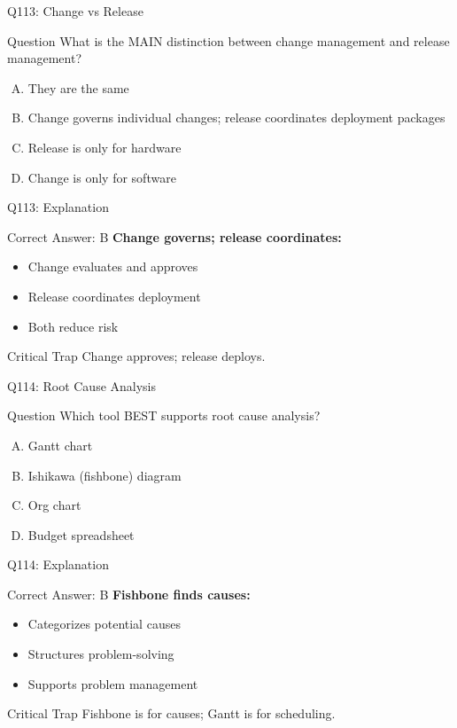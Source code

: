 \documentclass{beamer}
\begin{document}
	\begin{frame}{Q113: Change vs Release}
		\begin{block}{Question}
			What is the MAIN distinction between change management and release management?
		\end{block}
		\begin{enumerate}[(A)]
			\item They are the same
			\item Change governs individual changes; release coordinates deployment packages
			\item Release is only for hardware
			\item Change is only for software
		\end{enumerate}
	\end{frame}
	
	\begin{frame}{Q113: Explanation}
		\begin{block}{Correct Answer: B}
			\textbf{Change governs; release coordinates:}
			\begin{itemize}
				\item Change evaluates and approves
				\item Release coordinates deployment
				\item Both reduce risk
			\end{itemize}
		\end{block}
		\begin{alertblock}{Critical Trap}
			Change approves; release deploys.
		\end{alertblock}
	\end{frame}
	
	\begin{frame}{Q114: Root Cause Analysis}
		\begin{block}{Question}
			Which tool BEST supports root cause analysis?
		\end{block}
		\begin{enumerate}[(A)]
			\item Gantt chart
			\item Ishikawa (fishbone) diagram
			\item Org chart
			\item Budget spreadsheet
		\end{enumerate}
	\end{frame}
	
	\begin{frame}{Q114: Explanation}
		\begin{block}{Correct Answer: B}
			\textbf{Fishbone finds causes:}
			\begin{itemize}
				\item Categorizes potential causes
				\item Structures problem-solving
				\item Supports problem management
			\end{itemize}
		\end{block}
		\begin{alertblock}{Critical Trap}
			Fishbone is for causes; Gantt is for scheduling.
		\end{alertblock}
	\end{frame}
	
\end{document}
